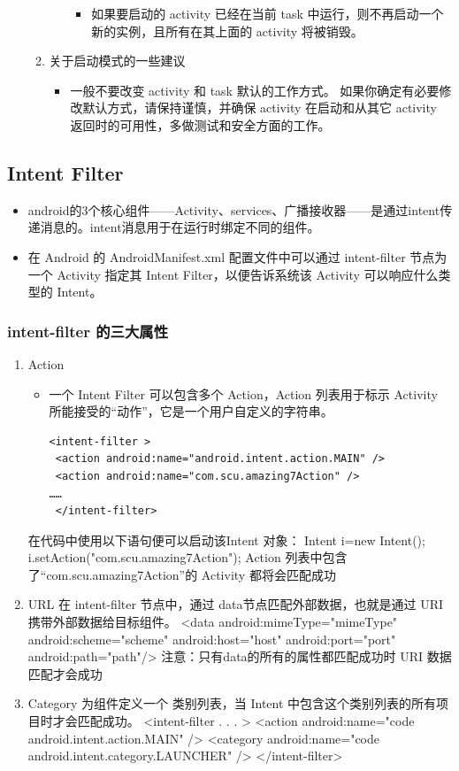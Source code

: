 \documentclass[9pt, b5paper]{article}
\begin{document}
\begin{enumerate}
\begin{enumerate}
\begin{itemize}
\begin{itemize}
\item 如果要启动的 activity 已经在当前 task 中运行，则不再启动一个新的实例，且所有在其上面的 activity 将被销毁。
\end{itemize}
\end{itemize}
\item 关于启动模式的一些建议
\label{sec-1-3-3-2-2}
\begin{itemize}
\item 一般不要改变 activity 和 task 默认的工作方式。 如果你确定有必要修改默认方式，请保持谨慎，并确保 activity 在启动和从其它 activity 返回时的可用性，多做测试和安全方面的工作。
\end{itemize}
\end{enumerate}
\end{enumerate}
\subsection{Intent Filter}
\label{sec-1-4}
\begin{itemize}
\item android的3个核心组件——Activity、services、广播接收器——是通过intent传递消息的。intent消息用于在运行时绑定不同的组件。
\item 在 Android 的 AndroidManifest.xml 配置文件中可以通过 intent-filter 节点为一个 Activity 指定其 Intent Filter，以便告诉系统该 Activity 可以响应什么类型的 Intent。
\end{itemize}
\subsubsection{intent-filter 的三大属性}
\label{sec-1-4-1}
\begin{enumerate}
\item Action
\label{sec-1-4-1-1}
\begin{itemize}
\item 一个 Intent Filter 可以包含多个 Action，Action 列表用于标示 Activity 所能接受的“动作”，它是一个用户自定义的字符串。
\begin{verbatim}
<intent-filter > 
 <action android:name="android.intent.action.MAIN" /> 
 <action android:name="com.scu.amazing7Action" /> 
……
 </intent-filter>
\end{verbatim}
\end{itemize}
在代码中使用以下语句便可以启动该Intent 对象：
Intent i=new Intent(); 
i.setAction("com.scu.amazing7Action");
Action 列表中包含了“com.scu.amazing7Action”的 Activity 都将会匹配成功
\item URL
\label{sec-1-4-1-2}
在 intent-filter 节点中，通过 data节点匹配外部数据，也就是通过 URI 携带外部数据给目标组件。
<data android:mimeType="mimeType" 
    android:scheme="scheme" 
     android:host="host"
     android:port="port" 
     android:path="path"/>
注意：只有data的所有的属性都匹配成功时 URI 数据匹配才会成功
\item Category
\label{sec-1-4-1-3}
为组件定义一个 类别列表，当 Intent 中包含这个类别列表的所有项目时才会匹配成功。
<intent-filter . . . >
   <action android:name="code android.intent.action.MAIN" />
   <category android:name="code　android.intent.category.LAUNCHER" />
</intent-filter>
\end{enumerate}
\end{document}
